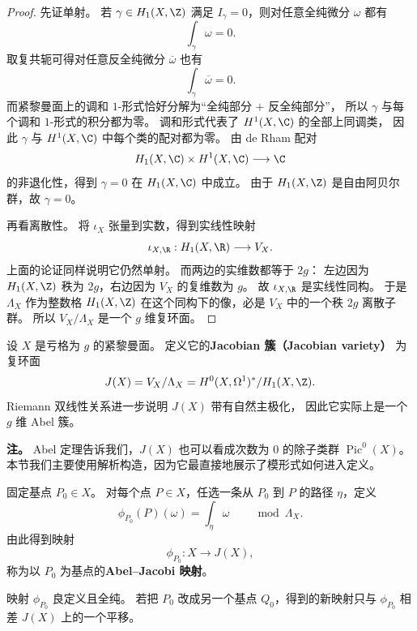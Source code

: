 \begin{proof}
先证单射。
若 $\gamma\in H_1(X,\Z)$ 满足 $I_\gamma=0$，则对任意全纯微分 $\omega$ 都有
\[
  \int_\gamma \omega=0.
\]
取复共轭可得对任意反全纯微分 $\overline{\omega}$ 也有
\[
  \int_\gamma \overline{\omega}=0.
\]
而紧黎曼面上的调和 $1$-形式恰好分解为“全纯部分 $+$ 反全纯部分”，
所以 $\gamma$ 与每个调和 $1$-形式的积分都为零。
调和形式代表了 $H^1(X,\C)$ 的全部上同调类，
因此 $\gamma$ 与 $H^1(X,\C)$ 中每个类的配对都为零。
由 de Rham 配对
\[
  H_1(X,\C)\times H^1(X,\C)\longrightarrow \C
\]
的非退化性，得到 $\gamma=0$ 在 $H_1(X,\C)$ 中成立。
由于 $H_1(X,\Z)$ 是自由阿贝尔群，故 $\gamma=0$。

再看离散性。
将 $\iota_X$ 张量到实数，得到实线性映射
\[
  \iota_{X,\R}:H_1(X,\R)\longrightarrow V_X.
\]
上面的论证同样说明它仍然单射。
而两边的实维数都等于 $2g$：
左边因为 $H_1(X,\Z)$ 秩为 $2g$，右边因为 $V_X$ 的复维数为 $g$。
故 $\iota_{X,\R}$ 是实线性同构。
于是 $\Lambda_X$ 作为整数格 $H_1(X,\Z)$ 在这个同构下的像，必是 $V_X$ 中的一个秩 $2g$ 离散子群。
所以 $V_X/\Lambda_X$ 是一个 $g$ 维复环面。
\end{proof}

\begin{definition}[Jacobian 簇]
\label{def:jacobian}
设 $X$ 是亏格为 $g$ 的紧黎曼面。
定义它的\textbf{Jacobian 簇（Jacobian variety）}
为复环面
\[
  J(X)=V_X/\Lambda_X
  =H^0(X,\Omega^1)^*/H_1(X,\Z).
\]
Riemann 双线性关系进一步说明 $J(X)$ 带有自然主极化，
因此它实际上是一个 $g$ 维 Abel 簇。
\end{definition}

\textbf{注。}
Abel 定理告诉我们，$J(X)$ 也可以看成次数为 $0$ 的除子类群 $\operatorname{Pic}^0(X)$。
本节我们主要使用解析构造，因为它最直接地展示了模形式如何进入定义。

\begin{definition}
\label{def:abel-jacobi-map}
固定基点 $P_0\in X$。
对每个点 $P\in X$，任选一条从 $P_0$ 到 $P$ 的路径 $\eta$，定义
\[
  \phi_{P_0}(P)(\omega)=\int_\eta \omega
  \qquad \bmod \Lambda_X.
\]
由此得到映射
\[
  \phi_{P_0}:X\longrightarrow J(X),
\]
称为以 $P_0$ 为基点的\textbf{Abel--Jacobi 映射}。
\end{definition}

\begin{proposition}
\label{prop:abel-jacobi-basic}
映射 $\phi_{P_0}$ 良定义且全纯。
若把 $P_0$ 改成另一个基点 $Q_0$，得到的新映射只与 $\phi_{P_0}$ 相差 $J(X)$ 上的一个平移。
\end{proposition}

